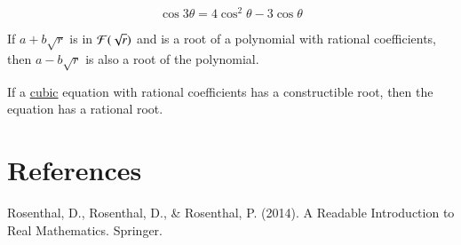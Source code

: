 \documentclass[11pt]{article}
\begin{document}
        \begin{theorem}[12.3.16]
            \[
                \cos 3\theta = 4 \cos^2 \theta - 3\cos \theta
            \]
        \end{theorem}
        
        \begin{theorem}[12.3.21]
            If $a + b \sqrt{r}$ is in $\mathcal{{F}}(\sqrt{r})$ and is a root of a polynomial with rational coefficients, then $a - b \sqrt{r}$ is also a root of the polynomial.
        \end{theorem}
        
        \begin{theorem}[12.3.22]
            If a \ul{cubic} equation with rational coefficients has a constructible root, then the equation has a rational root. 
        \end{theorem}
        
		\section*{References}
			Rosenthal, D., Rosenthal, D., \& Rosenthal, P. (2014). A Readable Introduction to Real Mathematics. Springer.
\end{document}
